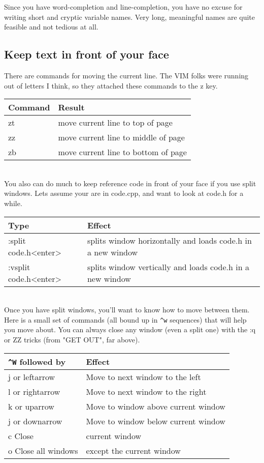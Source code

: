 \documentclass[a4paper, 12pt]{article}
\begin{document}
Since you have word-completion and line-completion, you have no excuse for writing short and cryptic variable names. Very long, meaningful names are quite feasible and not tedious at all.
\subsection{Keep text in front of your face}
\label{"Keep text in front of your face"}
There are commands for moving the current line. The VIM folks were running out of letters I think, so they attached these commands to the z key.

\begin{tabular}{ l | p{8cm} }
  \textbf{Command} & \textbf{Result}\\ \hline
      zt	& move current line to top of page \\
      zz	& move current line to middle of page \\
      zb	& move current line to bottom of page \\ \hline
\end{tabular}\\

You also can do much to keep reference code in front of your face if you use split windows. Lets assume your are in code.cpp, and want to look at code.h for a while.

\begin{tabular}{ l | p{8cm} }
  \textbf{Type} & \textbf{Effect}\\ \hline
      :split code.h<enter>  & splits window horizontally and loads code.h in a new window\\
      :vsplit code.h<enter> & splits window vertically and loads code.h in a new window\\ \hline
\end{tabular}\\

Once you have split windows, you'll want to know how to move between them. Here is a small set of commands (all bound up in \texttt{\^{}w} sequences) that will help you move about. You can always close any window (even a split one) with the :q or ZZ tricks (from "GET OUT", far above).

\begin{tabular}{ l | p{8cm} }
  \textbf{\texttt{\^{}W} followed by} & \textbf{Effect}\\ \hline
      j or leftarrow	  & Move to next window to the left\\
      l or rightarrow	  & Move to next window to the right\\
      k or uparrow	      & Move to window above current window\\
      j or downarrow	  & Move to window below current window\\
      c	Close             & current window\\
      o	Close all windows & except the current window\\ \hline
\end{tabular}\\
\end{document}
